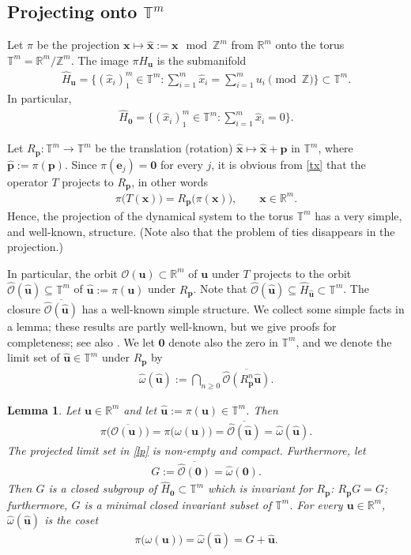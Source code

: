 \documentclass[11pt,reqno,tbtags,a4paper]{amsart}
\numberwithin{equation}{section}
\renewcommand\ge{\geq}
\renewcommand\geq{\geqslant}
\theoremstyle{plain}%
\newtheorem{lemma}[theorem]{Lemma}
\theoremstyle{definition}
\theoremstyle{remark}
\newcommand{\sumim}{\sum_{i=1}^m}
\newcommand\biggset[1]{\ensuremath{\biggl\{#1\biggr\}}}
\newcommand\bigpar[1]{\bigl(#1\bigr)}
\newcommand\bbR{\mathbb R}
\newcommand\bbT{\mathbb T}
\newcommand\gO{\hat{\cO}}
\newcommand\cL{{\omega}}
\newcommand\hcL{\hat{\cL}}
\newcommand\cO{\mathcal O}
\newcommand\hHo{\hH_{\0}}
\newcommand\ve{\mathbf{e}}
\newcommand\vp{\mathbf{p}}
\newcommand\hvp{\hat{\mathbf{p}}}
\newcommand\vu{\mathbf{u}}
\newcommand\hvu{{\hat{\mathbf{u}}}}
\newcommand\vx{\mathbf{x}}
\newcommand\hvx{\hat{\mathbf{x}}}
\newcommand\hx{\hat x}
\newcommand\Rp{R_\vp}
\newcommand\bcO[1]{\overline{\cO(#1)}}
\newcommand\bgO[1]{\overline{\gO(#1)}}
\newcommand\hH{\widehat{H}}
\newcommand{\R}{{\mathbb{R}}}
\newcommand{\Z}{{\mathbb{Z}}}
\newcommand{\T}{{\mathbb{T}}}
\newcommand\0{{\boldsymbol 0}}
\newcommand\1{{\boldsymbol 1}}
\begin{document}
\subsection{Projecting onto $\bbT^m$}\label{SSproj}
Let $\pi$ be the projection $\vx \mapsto \hvx := \vx \mod \Z^m$ from $\R^m$ onto the
torus $\T^m = \R^m / \Z^m$. The image $\pi H_\vu$ is the submanifold  
\begin{align}\label{Su}
\hH_\vu=
\biggset{(\hx_i)_1^m\in\bbT^m: \sum_{i=1}^m \hx_i =  \sumim u_i \pmod{ \Z}}
\subset\bbT^m. 
\end{align}
In particular, 
\begin{align}\label{Su0}
\hHo=
\biggset{(\hx_i)_1^m\in\bbT^m: \sum_{i=1}^m \hx_i = 0}.
\end{align}

Let $\Rp:\bbT^m\to\bbT^m$ be the translation (rotation) $\hvx\mapsto\hvx+\hvp$
in $\bbT^m$, where $\hvp:=\pi(\vp)$.
Since $\pi(\ve_j)=\0$ for every $j$, it is obvious from \eqref{tx} that the
operator $T$ projects to $\Rp$, in other words
\begin{align}\label{piT}
  \pi \bigpar{T(\vx)} = \Rp\bigpar{\pi(\vx)},
\qquad \vx\in\bbR^m.
\end{align}
Hence, the projection of the dynamical system to the torus 
$\bbT^m$ has a very simple,
and well-known, structure. 
(Note also that the problem of ties disappears in the projection.)

In particular, the orbit $\cO(\vu)\subset\bbR^m$ of $\vu$ under $T$ 
projects to the orbit $\gO(\hvu)\subseteq\bbT^m$ 
of $\hvu:=\pi(\vu)$ under $\Rp$. Note that
$\gO(\hvu)\subseteq \hH_\hvu\subset \bbT^m$.  
%
The closure $\bgO{\hvu}$ has a well-known simple structure.
We collect some simple facts  in a lemma; 
these results are partly well-known,
but we give proofs for completeness;
see also \cite[Section 2]{gun}.
We let $\0$ denote also the zero in $\bbT^m$,
and we denote the limit set of $\hvu\in\bbT^m$ under $\Rp$ by
\begin{align}
  \label{hcL}
\hcL(\hvu):=\bigcap_{n\ge0}\bgO{\Rp^n\hvu}.
\end{align}

\begin{lemma}\label{LP}
Let $\vu\in\bbR^m$ and let $\hvu:=\pi(\vu)\in\bbT^m$.
Then
\begin{align}\label{lp}
  \pi\bigpar{\bcO{\vu}}
=\pi\bigpar{\cL(\vu)}
=\bgO{\hvu}
=\hcL(\hvu).
\end{align}
The projected limit set in \eqref{lp} is non-empty and compact.
Furthermore, let
\begin{align}\label{G}
G:=\bgO{\0}=\hcL(\0). 
\end{align}
Then $G$ is a closed subgroup of\/ $\hHo\subset\bbT^m$
which is invariant for $\Rp$: 
$\Rp G = G$; furthermore, $G$ is a minimal closed invariant subset of\/ 
$\bbT^m$.
For every $\vu\in\bbR^m$, $\hcL(\hvu)$ is the coset
\begin{align}\label{lp2}
  \pi\bigpar{\cL(\vu)}=\hcL(\hvu)=G+\hvu.
\end{align}
\end{lemma}
\end{document}
